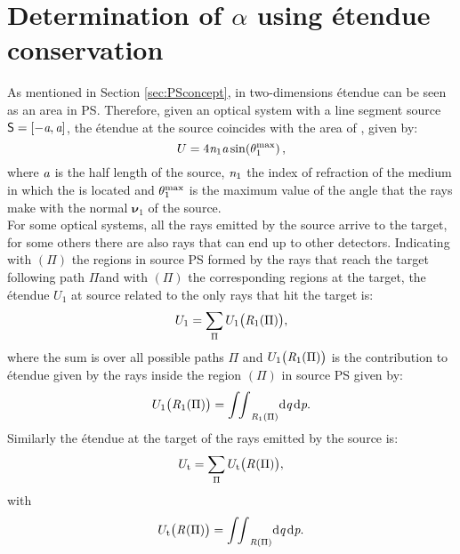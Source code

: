 \section{Determination of $\alpha$ using \'{e}tendue conservation} \label{sec:Tir_alpha}
As mentioned in Section \ref{sec:PSconcept}, in two-dimensions \'{e}tendue can be seen as an area in PS. 
Therefore, given an optical system with a line segment source $\textsf{S} = [-\textit{a}, \textit{a}]$, the \'{e}tendue at the source coincides with the area of , given by:
\begin{equation}\label{eq:etenduesource}
U = 4\textit{n}_1 \textit{a} \sin(\theta_1^{\textrm{max}})\,,
\end{equation}
 where $\textit{a}$ is the half length of the source, $\textit{n}_1$ the index of refraction of the medium in which the  is located and $\theta_1^{\textrm{max}}$ is the maximum value of the angle that the rays make with the normal $\boldsymbol{\nu}_1$ of the source.\\ \indent 
For some optical systems, all the rays emitted by the source arrive to the target, for some others there are also rays that can end up to other detectors. 
Indicating with $(\Pi)$ the regions in source PS formed by the rays that reach the target following path $\Pi$and with $(\Pi)$ the corresponding regions at the target, the \'{e}tendue $U_1$ at source related to the only rays that hit the target is:
\begin{equation}\label{eq:etenduesumsource}
U_1 = \sum_\Pi{U_1\big(\mbox{$\emph{R}_{\textit{$1$}}$}(\Pi)\big)},
\end{equation}
where the sum is over all possible paths $\Pi$ and $U_1\big(\mbox{$\emph{R}_{\textit{$1$}}$}(\Pi)\big)$ is the contribution to \'{e}tendue given by the rays inside the region 
$(\Pi)$ in source PS given by:
\begin{equation}\label{eq:etendueintegralsource}
U_1\big(\mbox{$\emph{R}_{\textit{$1$}}$}(\Pi)\big) = {\int\!\!\int}_{\emph{R}_1(\Pi)} \textrm{d}\textit{q}\,\textrm{d}\textit{p}.
\end{equation}
Similarly the \'{e}tendue at the target of the rays emitted by the source is:
\begin{equation}
U_\textrm{t}= \sum_\Pi{U_\textrm{t}\big(\mbox{$\emph{R}_{\textit{}}$}(\Pi)\big)},
\end{equation}
with
\begin{equation}\label{eq:etendueintegraltarget}
U_\textrm{t}\big(\mbox{$\emph{R}_{\textit{}}$}(\Pi)\big) = {\int\!\!\int}_{\emph{R}(\Pi)} \textrm{d}\textit{q}\,\textrm{d}\textit{p}.
\end{equation}

